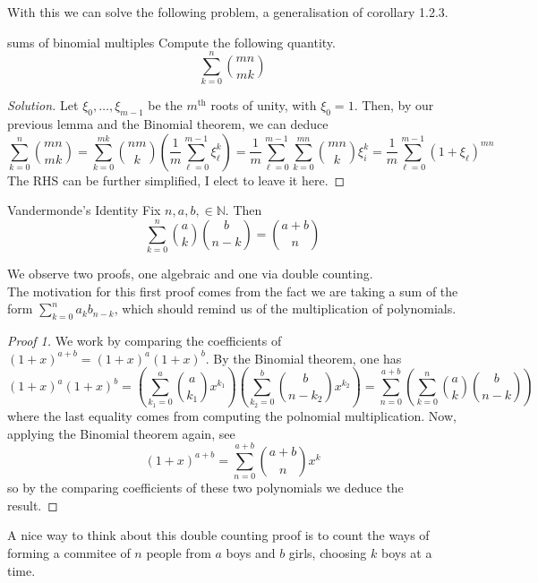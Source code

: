 \documentclass{article}
\begin{document}
With this we can solve the following problem, a generalisation of corollary 1.2.3.

\begin{problem}[]{sums of binomial multiples}
    Compute the following quantity. 
    \[\sum_{k=0}^n \binom{mn}{mk}\]
\end{problem}

\begin{proof}[Solution]
    Let $\xi_0, \dots, \xi_{m-1}$ be the $m^\text{th}$ roots of unity, with $\xi_0 = 1$. Then, by our previous lemma and the Binomial theorem,
    we can deduce 
    \[\sum_{k=0}^{n}\binom{mn}{mk} = \sum_{k=0}^{mk}\binom{nm}{k}\left(\frac{1}{m}\sum_{\ell = 0}^{m-1}\xi_\ell^k\right) 
    = \frac{1}{m}\sum_{\ell = 0}^{m-1} \sum_{k=0}^{mn} \binom{mn}{k}\xi_i^k = \frac{1}{m}\sum_{\ell = 0}^{m-1} (1+\xi_\ell)^{mn}\]
    The RHS can be further simplified, I elect to leave it here. 
\end{proof}

\begin{proposition}[]{Vandermonde's Identity}
    Fix $n, a, b, \in \mathbb{N}$. Then 
    \[\sum_{k=0}^n \binom{a}{k}\binom{b}{n-k} = \binom{a + b}{n}\]
\end{proposition}

We observe two proofs, one algebraic and one via double counting. \\ 

The motivation for this first proof comes from the fact we are taking a sum of the form $\sum_{k=0}^n a_kb_{n-k}$, 
which should remind us of the multiplication of polynomials. 

\begin{proof}[Proof 1]
    We work by comparing the coefficients of $(1+x)^{a+b} = (1+x)^a(1+x)^b$. By the Binomial theorem, one has
    \[(1+x)^a (1+x)^b = \left(\sum_{k_1=0}^a \binom{a}{k_1}x^{k_1}\right)\left(\sum_{k_2=0}^b \binom{b}{n - k_2}x^{k_2}\right)
    = \sum_{n=0}^{a+b}\left(\sum_{k=0}^n \binom{a}{k}\binom{b}{n-k}\right)\]
    where the last equality comes from computing the polnomial multiplication. Now, applying the Binomial theorem again, see 
    \[(1+x)^{a+b} = \sum_{n=0}^{a+b}\binom{a+b}{n}x^k\]
    so by the comparing coefficients of these two polynomials we deduce the result.
\end{proof}

A nice way to think about this double counting proof is to count the ways of forming a commitee of $n$ people from 
$a$ boys and $b$ girls, choosing $k$ boys at a time.
\end{document}
